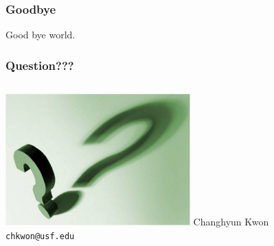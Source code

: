 \documentclass[xcolor=dvipsnames, unicode]{beamer}
\begin{document}

\begin{frame}
\frametitle{Goodbye}

Good bye world.

\end{frame}




\begin{frame}
\frametitle{Question???}
\begin{columns}[c]
\column{1.5in}
    \includegraphics[height=2in]{question}
\column{1.5in}
    Changhyun Kwon\\
    \texttt{chkwon@usf.edu}
\end{columns}
\end{frame}


%
%
\end{document}
